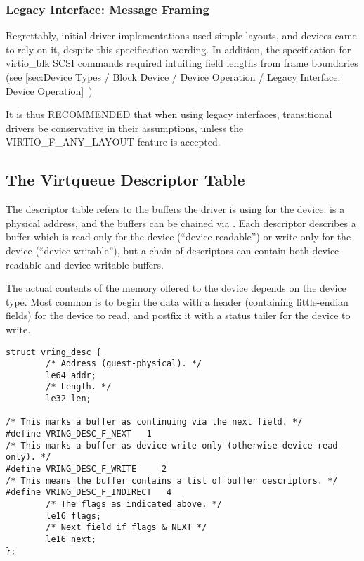 \subsubsection{Legacy Interface: Message Framing}\label{sec:Basic Facilities of a Virtio Device / Virtqueues / Message Framing / Legacy Interface: Message Framing}

Regrettably, initial driver implementations used simple layouts, and
devices came to rely on it, despite this specification wording.  In
addition, the specification for virtio_blk SCSI commands required
intuiting field lengths from frame boundaries (see
 \ref{sec:Device Types / Block Device / Device Operation / Legacy Interface: Device Operation}~)

It is thus RECOMMENDED that when using legacy interfaces, transitional
drivers be conservative in their assumptions, unless the
VIRTIO_F_ANY_LAYOUT feature is accepted.

\subsection{The Virtqueue Descriptor Table}\label{sec:Basic Facilities of a Virtio Device / Virtqueues / The Virtqueue Descriptor Table}

The descriptor table refers to the buffers the driver is using for
the device.  is a physical address, and the buffers
can be chained via . Each descriptor describes a
buffer which is read-only for the device (``device-readable'') or write-only for the device (``device-writable''), but a chain of
descriptors can contain both device-readable and device-writable buffers.

The actual contents of the memory offered to the device depends on the
device type.  Most common is to begin the data with a header
(containing little-endian fields) for the device to read, and postfix
it with a status tailer for the device to write.

\begin{lstlisting}
struct vring_desc {
        /* Address (guest-physical). */
        le64 addr;
        /* Length. */
        le32 len;

/* This marks a buffer as continuing via the next field. */
#define VRING_DESC_F_NEXT   1
/* This marks a buffer as device write-only (otherwise device read-only). */
#define VRING_DESC_F_WRITE     2
/* This means the buffer contains a list of buffer descriptors. */
#define VRING_DESC_F_INDIRECT   4
        /* The flags as indicated above. */
        le16 flags;
        /* Next field if flags & NEXT */
        le16 next;
};
\end{lstlisting}

